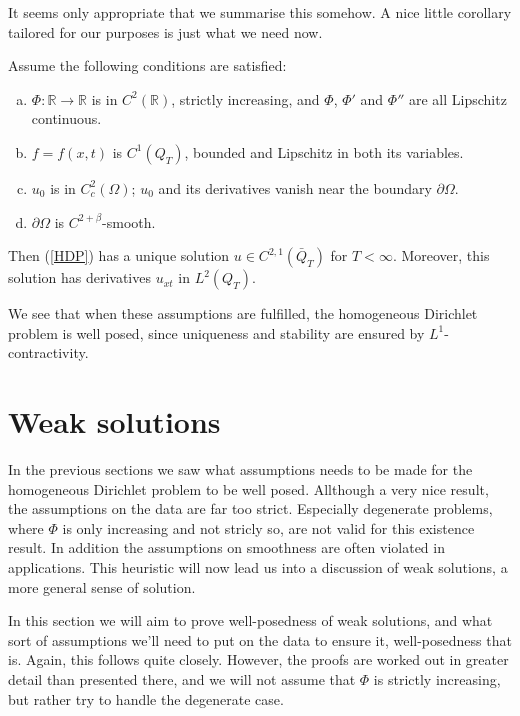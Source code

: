 \documentclass[11pt, a4paper]{article}
\begin{document}
It seems only appropriate that we summarise this somehow. A nice little corollary tailored for our purposes is just what we need now.

\begin{cor}
\label{cor:GPME_existence}
Assume the following conditions are satisfied:
	\begin{enumerate}[a)]
		\item 	$\Phi: \mathbb{R} \to \mathbb{R}$ is in $C^2(\mathbb{R})$, strictly increasing, and $\Phi$, $\Phi'$ and $\Phi''$ are all Lipschitz continuous.
		
		\item $f = f(x,t)$ is $C^1(Q_T)$, bounded and Lipschitz in both its variables.
		
		\item $u_0$ is in $C^2_c(\Omega)$; $u_0$ and its derivatives vanish near the boundary $\partial \Omega$.
		
		\item $\partial \Omega$ is $C^{2+\beta}$-smooth.
	
	\end{enumerate}
Then (\ref{HDP}) has a unique solution $u\in C^{2,1}(\bar{Q}_T)$ for $T<\infty$. Moreover, this solution has derivatives $u_{xt}$ in $L^2(Q_T)$.
\end{cor}

We see that when these assumptions are fulfilled, the homogeneous Dirichlet problem is well posed, since uniqueness and stability are ensured by $L^1$-contractivity.


\newpage
\section{Weak solutions}
In the previous sections we saw what assumptions needs to be made for the homogeneous Dirichlet problem to be well posed. Allthough a very nice result, the assumptions on the data are far too strict. Especially degenerate problems, where $\Phi$ is only increasing and not stricly so, are not valid for this existence result. In addition the assumptions on smoothness are often violated in applications. This heuristic will now lead us into a discussion of weak solutions, a more general sense of solution. 

In this section we will aim to prove well-posedness of weak solutions, and what sort of assumptions we'll need to put on the data to ensure it, well-posedness that is. Again, this follows \citep[Ch. 5]{vazquez2007porous} quite closely. However, the proofs are worked out in greater detail than presented there, and we will not assume that $\Phi$ is strictly increasing, but rather try to handle the degenerate case.
\end{document}
